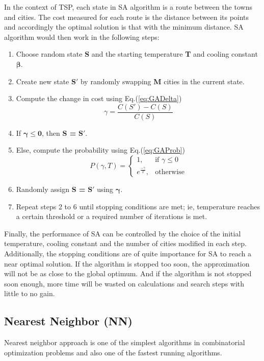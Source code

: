 \documentclass[twocolumn]{article}
\begin{document}
	In the context of TSP, each state in SA algorithm is a route between the towns and cities. The cost measured for each route is the distance  between its points and accordingly the optimal solution is that with the minimum distance. SA algorithm would then work in the following steps:
	\begin{enumerate}
		\item Choose random state {\bfseries S} and the starting temperature {\bfseries T} and cooling constant {$\boldsymbol \beta$}.
		\item Create new state $\boldsymbol{S\prime}$ by randomly swapping {\bfseries M} cities in the current state.
		\item Compute the change in cost using Eq.(\ref{eq:GADelta})
		\begin{equation} \label{eq:GADelta}
		\gamma = \dfrac{C(S')-C(S)}{C(S)}
		\end{equation}
		\item If {$\boldsymbol{\gamma \leqslant 0}$, then {\bfseries S =} $\boldsymbol{S\prime}$.}
		\item Else, compute the probability using Eq.(\ref{eq:GAProb})
		\begin{equation} \label{eq:GAProb}
		P(\gamma, T)=
		\begin{cases}
		1,& \text{if } \gamma\leqslant 0\\
		e^{\frac{-\gamma}{T}},& \text{otherwise}
		\end{cases} 
		\end{equation}
		\item Randomly assign {\bfseries S =} $\boldsymbol{S\prime}$ using {$\boldsymbol \gamma$}.
		\item Repeat steps 2 to 6 until stopping conditions are met; ie, temperature reaches a certain threshold or a required number of iterations is met.
	\end{enumerate}
	Finally, the performance of SA can be controlled by the choice of the initial temperature, cooling constant and the number of cities modified in each step. Additionally, the stopping conditions are of quite importance for SA to reach a near optimal solution. If the algorithm is stopped too soon, the approximation will not be as close to the global optimum. And if the algorithm is not stopped soon enough, more time will be wasted on calculations and search steps with little to no gain.

	\subsection{Nearest Neighbor (NN)}
	Nearest neighbor approach is one of the simplest algorithms in combinatorial optimization problems and also one of the fastest running algorithms\cite{GreedyNN}.
	
\end{document}
